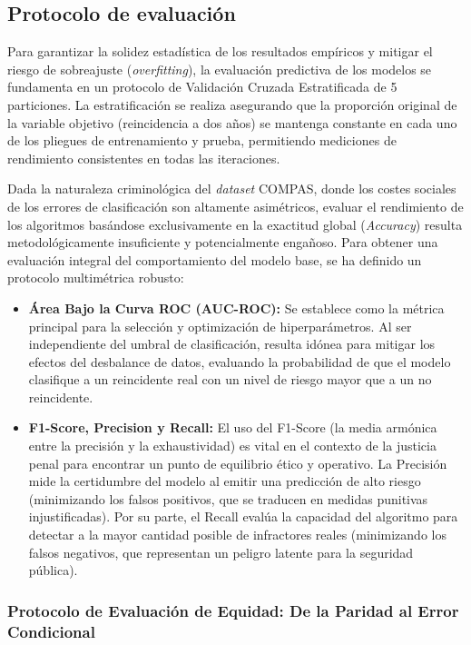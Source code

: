 \documentclass[11pt,a4paper]{article}
\begin{document}
\subsection{Protocolo de evaluación}

Para garantizar la solidez estadística de los resultados empíricos y mitigar el riesgo de sobreajuste (\textit{overfitting}), la evaluación predictiva de los modelos se fundamenta en un protocolo de Validación Cruzada Estratificada de 5 particiones. La estratificación se realiza asegurando que la proporción original de la variable objetivo (reincidencia a dos años) se mantenga constante en cada uno de los pliegues de entrenamiento y prueba, permitiendo mediciones de rendimiento consistentes en todas las iteraciones.

Dada la naturaleza criminológica del \textit{dataset} COMPAS, donde los costes sociales de los errores de clasificación son altamente asimétricos, evaluar el rendimiento de los algoritmos basándose exclusivamente en la exactitud global (\textit{Accuracy}) resulta metodológicamente insuficiente y potencialmente engañoso. Para obtener una evaluación integral del comportamiento del modelo base, se ha definido un protocolo multimétrica robusto:

\begin{itemize}
    \item \textbf{Área Bajo la Curva ROC (AUC-ROC):} Se establece como la métrica principal para la selección y optimización de hiperparámetros. Al ser independiente del umbral de clasificación, resulta idónea para mitigar los efectos del desbalance de datos, evaluando la probabilidad de que el modelo clasifique a un reincidente real con un nivel de riesgo mayor que a un no reincidente.
    \item \textbf{F1-Score, Precision y Recall:} El uso del F1-Score (la media armónica entre la precisión y la exhaustividad) es vital en el contexto de la justicia penal para encontrar un punto de equilibrio ético y operativo. La Precisión mide la certidumbre del modelo al emitir una predicción de alto riesgo (minimizando los falsos positivos, que se traducen en medidas punitivas injustificadas). Por su parte, el Recall evalúa la capacidad del algoritmo para detectar a la mayor cantidad posible de infractores reales (minimizando los falsos negativos, que representan un peligro latente para la seguridad pública).
\end{itemize}

\subsubsection{Protocolo de Evaluación de Equidad: De la Paridad al Error Condicional}
\end{document}
